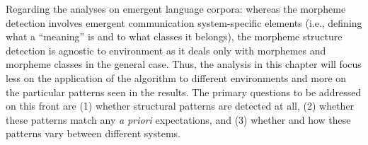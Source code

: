 Regarding the analyses on emergent language corpora:
  whereas the morpheme detection involves emergent communication system-specific elements (i.e., defining what a ``meaning'' is and to what classes it belongs), the morpheme structure detection is agnostic to environment as it deals only with morphemes and morpheme classes in the general case.
Thus, the analysis in this chapter will focus less on the application of the algorithm to different environments and more on the particular patterns seen in the results.
The primary questions to be addressed on this front are
  (1) whether structural patterns are detected at all,
  (2) whether these patterns match any \emph{a priori} expectations,
  and (3) whether and how these patterns vary between different systems.
